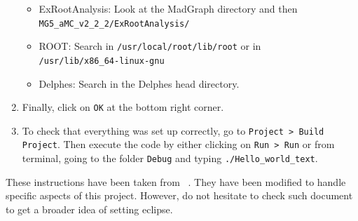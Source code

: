 \documentclass[12pt, oneside]{book}              %
\begin{document}
\begin{enumerate}
\begin{itemize}
	\item ExRootAnalysis: Look at the MadGraph directory and then \\
	\texttt{MG5\_aMC\_v2\_2\_2/ExRootAnalysis/}
	\item ROOT: Search in \texttt{/usr/local/root/lib/root} or in \\
	\texttt{/usr/lib/x86\_64-linux-gnu}
	\item Delphes: Search in the Delphes head directory.
\end{itemize}

\item Finally, click on \texttt{OK} at the bottom right corner.

\item To check that everything was set up correctly, go to \texttt{Project > 
	Build Project}. Then execute the code by either clicking on \texttt{Run > Run}
	or from terminal, going to the folder \texttt{Debug} and typing
	\texttt{./Hello\_world\_text}.
\end{enumerate}

These instructions have been taken from ~\cite{eclipse}. They have
been modified to handle specific aspects of this project. However, do not
hesitate to check such document to get a broader idea of setting eclipse.
\end{document}
